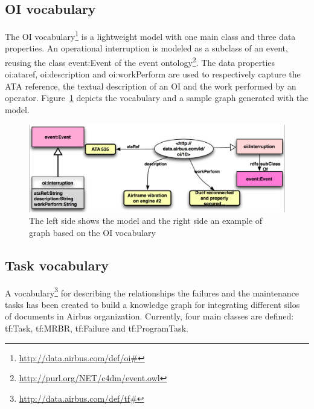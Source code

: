 \documentclass[a4paper,english,submission]{rnti}  %
\begin{document}
\subsection{OI vocabulary}
\label{oivocab}
The OI vocabulary\footnote{\url{http://data.airbus.com/def/oi#}} is a lightweight model with one main class and three data properties. An operational interruption is modeled as a subclass of an event, reusing the class \textsf{event:Event} of the event ontology\footnote{\url{http://purl.org/NET/c4dm/event.owl}}. The data properties \textsf{oi:ataref}, \textsf{oi:description} and \textsf{oi:workPerform} are used to respectively capture the ATA reference, the textual description of an OI and the work performed by an operator. Figure~\ref{figoi} depicts the vocabulary and a sample graph generated with the model. 

\begin{figure}[!htb]
\centering
\includegraphics[scale=0.45]{img/oi-graph-model.png}
\caption{The left side shows the model and the right side an example of graph based on the OI vocabulary }
\label{figoi}
\end{figure} 
 

\subsection{Task vocabulary}
\label{sec:mpd-vocab} 
A vocabulary\footnote{\url{http://data.airbus.com/def/tf#}} for describing the relationships the failures and the maintenance tasks has been created to build a knowledge graph for integrating different silos of documents in Airbus organization. Currently, four main classes are defined: \textsf{tf:Task}, \textsf{tf:MRBR}, \textsf{tf:Failure} and \textsf{tf:ProgramTask}. 
\end{document}
